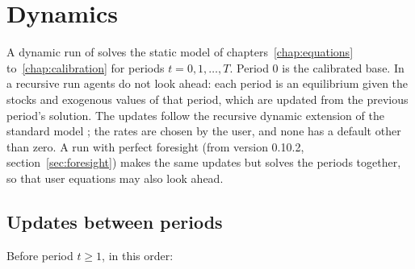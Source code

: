 \chapter{Dynamics}\label{chap:dynamics}

A dynamic run of  solves the static model of
chapters~\ref{chap:equations} to~\ref{chap:calibration} for periods
$t = 0, 1, \dots, T$. Period 0 is the calibrated base. In a recursive run
agents do not look ahead: each period is an equilibrium given the stocks and
exogenous values of that period, which are updated from the previous period's
solution. The updates follow the recursive dynamic extension of the standard
model \citep{thurlow2004}; the rates are chosen by the user, and none has a
default other than zero. A run with perfect foresight (from version 0.10.2,
section~\ref{sec:foresight}) makes the same updates but solves the periods
together, so that user equations may also look ahead.

\section{Updates between periods}

Before period $t \ge 1$, in this order:

